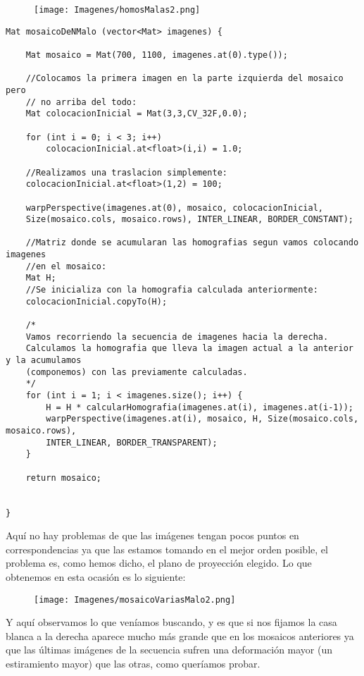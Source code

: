 \documentclass[10pt,a4paper]{article}
\begin{document}
\begin{figure}[H]
\centering
\texttt{[image: Imagenes/homosMalas2.png]}
\end{figure}

\begin{lstlisting}
Mat mosaicoDeNMalo (vector<Mat> imagenes) {

	Mat mosaico = Mat(700, 1100, imagenes.at(0).type());
	
	//Colocamos la primera imagen en la parte izquierda del mosaico pero
	// no arriba del todo:
	Mat colocacionInicial = Mat(3,3,CV_32F,0.0);
	
	for (int i = 0; i < 3; i++)
		colocacionInicial.at<float>(i,i) = 1.0;
		
	//Realizamos una traslacion simplemente:
	colocacionInicial.at<float>(1,2) = 100;
	
	warpPerspective(imagenes.at(0), mosaico, colocacionInicial, 
	Size(mosaico.cols, mosaico.rows), INTER_LINEAR, BORDER_CONSTANT);
	
	//Matriz donde se acumularan las homografias segun vamos colocando imagenes
	//en el mosaico:
	Mat H;
	//Se inicializa con la homografia calculada anteriormente:
	colocacionInicial.copyTo(H);
	
	/*
	Vamos recorriendo la secuencia de imagenes hacia la derecha.
	Calculamos la homografia que lleva la imagen actual a la anterior y la acumulamos
	(componemos) con las previamente calculadas.	
	*/
	for (int i = 1; i < imagenes.size(); i++) {
		H = H * calcularHomografia(imagenes.at(i), imagenes.at(i-1));
		warpPerspective(imagenes.at(i), mosaico, H, Size(mosaico.cols, mosaico.rows),
		INTER_LINEAR, BORDER_TRANSPARENT);	
	}	
	
	return mosaico;


}

\end{lstlisting}

Aquí no hay problemas de que las imágenes tengan pocos puntos en correspondencias ya que las estamos tomando en el mejor orden posible, el problema es, como hemos dicho, el plano de proyección elegido. Lo que obtenemos en esta ocasión es lo siguiente:\\

\begin{figure}[H]
\centering
\texttt{[image: Imagenes/mosaicoVariasMalo2.png]}
\end{figure}

Y aquí observamos lo que veníamos buscando, y es que si nos fijamos la casa blanca a la derecha aparece mucho más grande que en los mosaicos anteriores ya que las últimas imágenes de la secuencia sufren una deformación mayor (un estiramiento mayor) que las otras, como queríamos probar.\\
\end{document}

